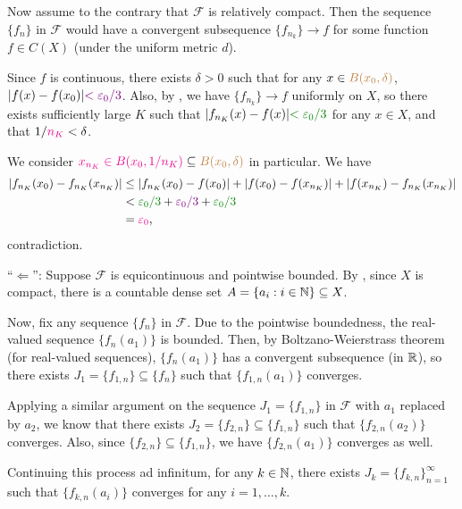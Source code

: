 \begin{enumerate}
\begin{pf}
Now assume to the contrary that \(\mathcal{F}\) is relatively compact. Then the
sequence \(\{f_n\}\) in \(\mathcal{F}\) would have a convergent subsequence
\(\{f_{n_k}\}\to f\) for some function \(f\in C(X)\) (under the uniform metric
\(d\)).

Since \(f\) is continuous, there exists \(\delta>0\) such that for any \(x\in
{\color{brown}B(x_0,\delta)}\), \(|f(x)-f(x_0)|{\color{violet}<\varepsilon_0/3}\). Also, by
, we have \(\{f_{n_k}\}\to f\) uniformly on
\(X\), so there exists sufficiently large \(K\) such that
\(|f_{n_K}(x)-f(x)|\gc{<\varepsilon_0/3}\) for any \(x\in X\), and that \(1/{\color{magenta}n_K}<\delta\).

We consider \({\color{magenta}x_{n_K}\in B(x_0,1/n_K)}\subseteq {\color{brown}B(x_0,\delta)}\) in
particular. We have
\begin{align*}
|f_{n_K}(x_0)-f_{n_K}(x_{n_K})|
&\le |f_{n_K}(x_0)-f(x_0)|+|f(x_0)-f(x_{n_K})|+|f(x_{n_K})-f_{n_K}(x_{n_K})| \\
&<\gc{\varepsilon_0/3}+\vc{\varepsilon_0/3}+\gc{\varepsilon_0/3} \\
&=\mgc{\varepsilon_0},
\end{align*}
contradiction.

``\(\Leftarrow\)'': Suppose \(\mathcal{F}\) is equicontinuous and pointwise
bounded. By , since \(X\) is compact, there is a
countable dense set \(A=\{a_i:i\in\mathbb{N}\}\subseteq X\).

Now, fix any sequence \(\{f_n\}\) in \(\mathcal{F}\). Due to the pointwise
boundedness, the real-valued sequence \(\{f_n(a_1)\}\) is bounded. Then, by
Boltzano-Weierstrass theorem (for real-valued sequences), \(\{f_n(a_1)\}\) has
a convergent subsequence (in \(\mathbb{R}\)), so there exists
\(J_1=\{f_{1,n}\}\subseteq \{f_n\}\) such that \(\{f_{1,n}(a_1)\}\) converges.

Applying a similar argument on the sequence \(J_1=\{f_{1,n}\}\) in
\(\mathcal{F}\) with \(a_1\) replaced by \(a_2\), we know that there exists
\(J_2=\{f_{2,n}\}\subseteq \{f_{1,n}\}\) such that \(\{f_{2,n}(a_2)\}\)
converges. Also, since \(\{f_{2,n}\}\subseteq \{f_{1,n}\}\), we have
\(\{f_{2,n}(a_1)\}\) converges as well.

Continuing this process ad infinitum, for any \(k\in\mathbb{N}\), there exists
\(J_k=\{f_{k,n}\}_{n=1}^{\infty}\) such that \(\{f_{k,n}(a_i)\}\) converges for
any \(i=1,\dotsc,k\).


\end{pf}
\end{enumerate}
